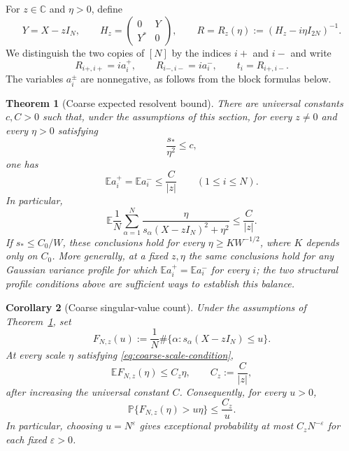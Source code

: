 \documentclass[11pt,reqno]{amsart}
\numberwithin{equation}{section}
\theoremstyle{plain}
\newtheorem{theorem}{Theorem}[section]
\newtheorem{corollary}[theorem]{Corollary}
\theoremstyle{definition}
\theoremstyle{remark}
\begin{document}
For $z\in\mathbb C$ and $\eta>0$, define
\begin{equation}\label{eq:coarse-hermitization}
 Y=X-zI_N,\qquad
 H_z=\begin{pmatrix}0&Y\\Y^*&0\end{pmatrix},\qquad
 R=R_z(\eta):=(H_z-i\eta I_{2N})^{-1}.
\end{equation}
We distinguish the two copies of $[N]$ by the indices $i+$ and $i-$ and
write
\begin{equation}\label{eq:coarse-diagonal-notation}
 R_{i+,i+}=ia_i^+,\qquad R_{i-,i-}=ia_i^-,\qquad
 t_i=R_{i+,i-}.
\end{equation}
The variables $a_i^\pm$ are nonnegative, as follows from the block formulas
below.

\begin{theorem}[Coarse expected resolvent bound]\label{thm:coarse}
There are universal constants $c,C>0$ such that, under the assumptions of
this section, for every $z\ne0$ and every $\eta>0$ satisfying
\begin{equation}\label{eq:coarse-scale-condition}
 \frac{s_*}{\eta^2}\le c,
\end{equation}
one has
\begin{equation}\label{eq:coarse-coordinate-bound}
 \mathbb E a_i^+=\mathbb E a_i^-\le\frac{C}{|z|}
 \qquad (1\le i\le N).
\end{equation}
In particular,
\begin{equation}\label{eq:coarse-trace-bound}
 \mathbb E\frac1N\sum_{\alpha=1}^N
 \frac{\eta}{s_\alpha(X-zI_N)^2+\eta^2}
 \le\frac{C}{|z|}.
\end{equation}
If $s_*\le C_0/W$, these conclusions hold for every
$\eta\ge K W^{-1/2}$, where $K$ depends only on $C_0$.
More generally, at a fixed $z,\eta$ the same conclusions hold for any
Gaussian variance profile for which
$\mathbb E a_i^+=\mathbb E a_i^-$ for every $i$; the two structural
profile conditions above are sufficient ways to establish this balance.
\end{theorem}

\begin{corollary}[Coarse singular-value count]\label{cor:coarse-count}
Under the assumptions of Theorem~\ref{thm:coarse}, set
\[
 F_{N,z}(u):=\frac1N\#\{\alpha:s_\alpha(X-zI_N)\le u\}.
\]
At every scale $\eta$ satisfying \eqref{eq:coarse-scale-condition},
\begin{equation}\label{eq:coarse-count-expectation}
 \mathbb E F_{N,z}(\eta)\le C_z\eta,
 \qquad C_z:=\frac{C}{|z|},
\end{equation}
after increasing the universal constant $C$.  Consequently, for every
$u>0$,
\begin{equation}\label{eq:coarse-count-markov}
 \mathbb P\{F_{N,z}(\eta)>u\eta\}\le\frac{C_z}{u}.
\end{equation}
In particular, choosing $u=N^\varepsilon$ gives exceptional probability
at most $C_zN^{-\varepsilon}$ for each fixed $\varepsilon>0$.
\end{corollary}
\end{document}

